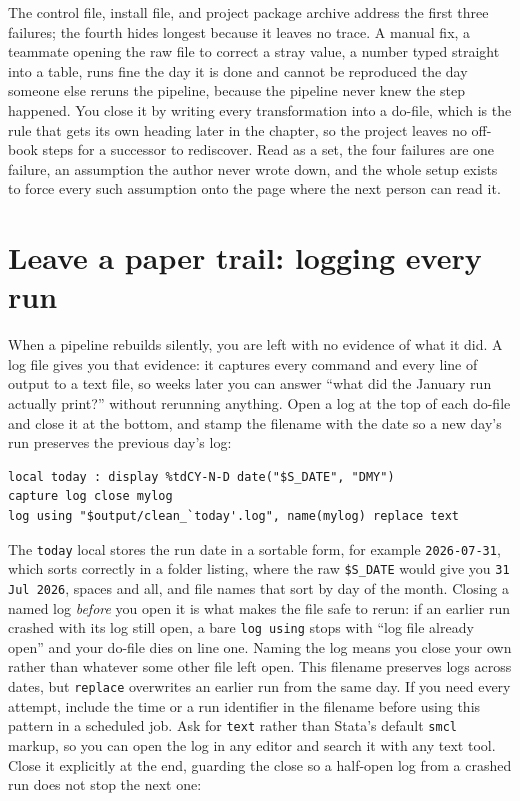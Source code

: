 The control file, install file, and project package archive address the first three failures; the fourth hides longest because it leaves no trace. A manual fix, a teammate opening the raw file to correct a stray value, a number typed straight into a table, runs fine the day it is done and cannot be reproduced the day someone else reruns the pipeline, because the pipeline never knew the step happened. You close it by writing every transformation into a do-file, which is the rule that gets its own heading later in the chapter, so the project leaves no off-book steps for a successor to rediscover. Read as a set, the four failures are one failure, an assumption the author never wrote down, and the whole setup exists to force every such assumption onto the page where the next person can read it.

\section{Leave a paper trail: logging every run}\label{sec:logging}
When a pipeline rebuilds silently, you are left with no evidence of what it did. A log file gives you that evidence: it captures every command and every line of output to a text file, so weeks later you can answer \enquote{what did the January run actually print?} without rerunning anything. Open a log at the top of each do-file and close it at the bottom, and stamp the filename with the date so a new day's run preserves the previous day's log:
\par
{\footnotesize
\begin{verbatim}
local today : display %tdCY-N-D date("$S_DATE", "DMY")
capture log close mylog
log using "$output/clean_`today'.log", name(mylog) replace text
\end{verbatim}
}
The \texttt{today} local stores the run date in a sortable form, for example \texttt{2026-07-31}, which sorts correctly in a folder listing, where the raw \texttt{\$S\_DATE} would give you \texttt{31 Jul 2026}, spaces and all, and file names that sort by day of the month. Closing a named log \emph{before} you open it is what makes the file safe to rerun: if an earlier run crashed with its log still open, a bare \texttt{log using} stops with \enquote{log file already open} and your do-file dies on line one. Naming the log means you close your own rather than whatever some other file left open. This filename preserves logs across dates, but \texttt{replace} overwrites an earlier run from the same day. If you need every attempt, include the time or a run identifier in the filename before using this pattern in a scheduled job. Ask for \texttt{text} rather than Stata's default \texttt{smcl} markup, so you can open the log in any editor and search it with any text tool. Close it explicitly at the end, guarding the close so a half-open log from a crashed run does not stop the next one:
